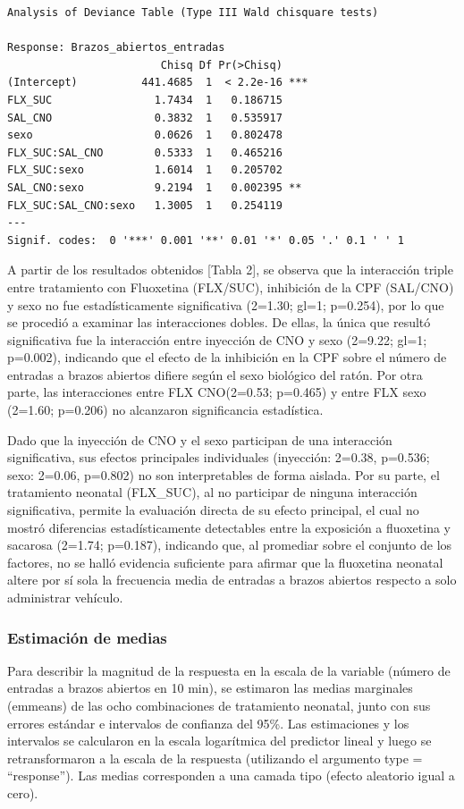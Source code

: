 \documentclass[
  letterpaper,
  DIV=11,
  numbers=noendperiod]{scrartcl}
\begin{document}
\begin{verbatim}
Analysis of Deviance Table (Type III Wald chisquare tests)

Response: Brazos_abiertos_entradas
                        Chisq Df Pr(>Chisq)    
(Intercept)          441.4685  1  < 2.2e-16 ***
FLX_SUC                1.7434  1   0.186715    
SAL_CNO                0.3832  1   0.535917    
sexo                   0.0626  1   0.802478    
FLX_SUC:SAL_CNO        0.5333  1   0.465216    
FLX_SUC:sexo           1.6014  1   0.205702    
SAL_CNO:sexo           9.2194  1   0.002395 ** 
FLX_SUC:SAL_CNO:sexo   1.3005  1   0.254119    
---
Signif. codes:  0 '***' 0.001 '**' 0.01 '*' 0.05 '.' 0.1 ' ' 1
\end{verbatim}

A partir de los resultados obtenidos {[}Tabla 2{]}, se observa que la
interacción triple entre tratamiento con Fluoxetina (FLX/SUC),
inhibición de la CPF (SAL/CNO) y sexo no fue estadísticamente
significativa (2=1.30; gl=1; p=0.254), por lo que se procedió a examinar
las interacciones dobles. De ellas, la única que resultó significativa
fue la interacción entre inyección de CNO y sexo (2=9.22; gl=1;
p=0.002), indicando que el efecto de la inhibición en la CPF sobre el
número de entradas a brazos abiertos difiere según el sexo biológico del
ratón. Por otra parte, las interacciones entre FLX CNO(2=0.53; p=0.465)
y entre FLX sexo (2=1.60; p=0.206) no alcanzaron significancia
estadística.

Dado que la inyección de CNO y el sexo participan de una interacción
significativa, sus efectos principales individuales (inyección: 2=0.38,
p=0.536; sexo: 2=0.06, p=0.802) no son interpretables de forma aislada.
Por su parte, el tratamiento neonatal (FLX\_SUC), al no participar de
ninguna interacción significativa, permite la evaluación directa de su
efecto principal, el cual no mostró diferencias estadísticamente
detectables entre la exposición a fluoxetina y sacarosa (2=1.74;
p=0.187), indicando que, al promediar sobre el conjunto de los factores,
no se halló evidencia suficiente para afirmar que la fluoxetina neonatal
altere por sí sola la frecuencia media de entradas a brazos abiertos
respecto a solo administrar vehículo.

\subsubsection{Estimación de medias}\label{estimaciuxf3n-de-medias}

Para describir la magnitud de la respuesta en la escala de la variable
(número de entradas a brazos abiertos en 10 min), se estimaron las
medias marginales (emmeans) de las ocho combinaciones de tratamiento
neonatal, junto con sus errores estándar e intervalos de confianza del
95\%. Las estimaciones y los intervalos se calcularon en la escala
logarítmica del predictor lineal y luego se retransformaron a la escala
de la respuesta (utilizando el argumento type = ``response''). Las
medias corresponden a una camada tipo (efecto aleatorio igual a cero).
\end{document}
